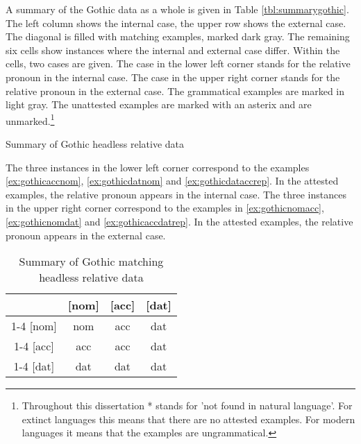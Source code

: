 A summary of the Gothic data as a whole is given in Table \ref{tbl:summarygothic}. The left column shows the internal case, the upper row shows the external case. The diagonal is filled with matching examples, marked dark gray.
The remaining six cells show instances where the internal and external case differ. Within the cells, two cases are given. The case in the lower left corner stands for the relative pronoun in the internal case. The case in the upper right corner stands for the relative pronoun in the external case. The grammatical examples are marked in light gray. The unattested examples are marked with an asterix and are unmarked.\footnote{
Throughout this dissertation * stands for 'not found in natural language'. For extinct languages this means that there are no attested examples. For modern languages it means that the examples are ungrammatical.
}

\begin{table}[H]
  \center
  \caption {Summary of Gothic headless relative data}
    
    \label{tbl:summarygothic}
\end{table}

The three instances in the lower left corner correspond to the examples \ref{ex:gothicaccnom}, \ref{ex:gothicdatnom} and \ref{ex:gothicdataccrep}. In the attested examples, the relative pronoun appears in the internal case.
The three instances in the upper right corner correspond to the examples in \ref{ex:gothicnomacc}, \ref{ex:gothicnomdat} and \ref{ex:gothicaccdatrep}. In the attested examples, the relative pronoun appears in the external case.


\begin{table}[H]
  \center
  \caption {Summary of Gothic matching headless relative data}
    \begin{tabular}{c|c|c|c}
      \toprule
            & [\ac{nom}]
            & [\ac{acc}]
            & [\ac{dat}]
            \\ \cmidrule{1-4}
        [\ac{nom}]
            & \ac{nom}
            & \ac{acc}
            & \ac{dat}
            \\ \cmidrule{1-4}
        [\ac{acc}]
            & \ac{acc}
            & \ac{acc}
            & \ac{dat}
            \\ \cmidrule{1-4}
        [\ac{dat}]
            & \ac{dat}
            & \ac{dat}
            & \ac{dat}
            \\
      \bottomrule
    \end{tabular}
    \label{tbl:summarygothic1}
\end{table}


